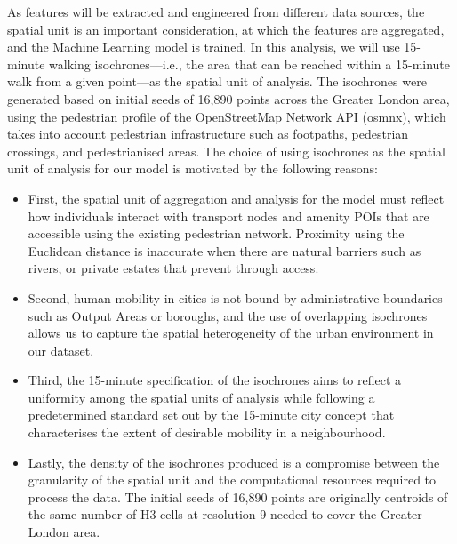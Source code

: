 As features will be extracted and engineered from different data sources, the spatial unit is an important consideration, at which the features are aggregated, and the Machine Learning model is trained. In this analysis, we will use 15-minute walking isochrones---i.e., the area that can be reached within a 15-minute walk from a given point---as the spatial unit of analysis. The isochrones were generated based on initial seeds of 16,890 points across the Greater London area, using the pedestrian profile of the OpenStreetMap Network API (osmnx), which takes into account pedestrian infrastructure such as footpaths, pedestrian crossings, and pedestrianised areas. The choice of using isochrones as the spatial unit of analysis for our model is motivated by the following reasons: 

\begin{itemize}
    \setlength\itemsep{0em}
    \item First, the spatial unit of aggregation and analysis for the model must reflect how individuals interact with transport nodes and amenity POIs that are accessible using the existing pedestrian network. Proximity using the Euclidean distance is inaccurate when there are natural barriers such as rivers, or private estates that prevent through access. 
    \item Second, human mobility in cities is not bound by administrative boundaries such as Output Areas or boroughs, and the use of overlapping isochrones allows us to capture the spatial heterogeneity of the urban environment in our dataset.
    \item Third, the 15-minute specification of the isochrones aims to reflect a uniformity among the spatial units of analysis while following a predetermined standard set out by the 15-minute city concept that characterises the extent of desirable mobility in a neighbourhood.
    \item Lastly, the density of the isochrones produced is a compromise between the granularity of the spatial unit and the computational resources required to process the data. The initial seeds of 16,890 points are originally centroids of the same number of H3 cells at resolution 9 needed to cover the Greater London area. 
\end{itemize}

